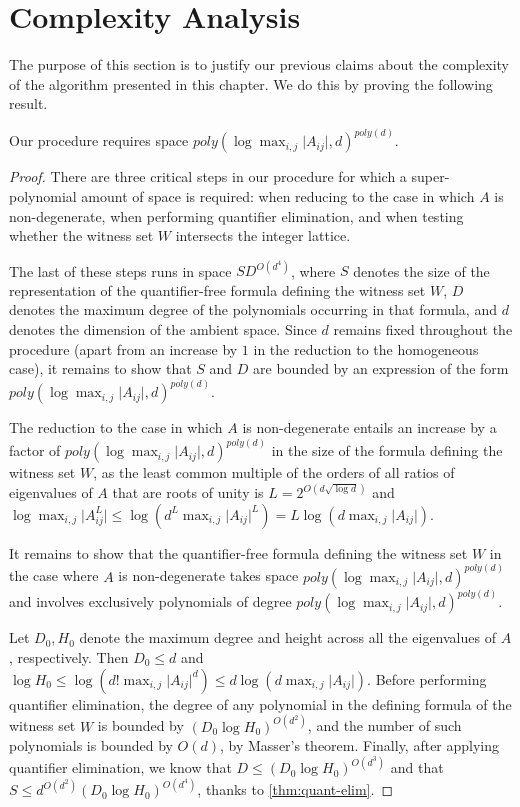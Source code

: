 \section{Complexity Analysis}
\label{sec:complexity}

The purpose of this section is to justify our previous claims about
the complexity of the algorithm presented in this chapter. We do this by
proving the following result.

\begin{proposition}
Our procedure requires space $\mathit{poly}(\log\max_{i,j}\lvert A_{ij}\rvert,d)^{\mathit{poly}(d)}$.
\end{proposition}

\begin{proof}
There are three critical steps in our procedure for which a
super-polynomial amount of space is required: when reducing to the
case in which $A$ is non-degenerate, when performing quantifier
elimination, and when testing whether the witness set $W$ intersects
the integer lattice.

The last of these steps runs in space $SD^{O(d^4)}$, where $S$ denotes
the size of the representation of the quantifier-free formula defining
the witness set $W$, $D$ denotes the maximum degree of the polynomials
occurring in that formula, and $d$ denotes the dimension of the
ambient space. Since $d$ remains fixed throughout the procedure (apart
from an increase by $1$ in the reduction to the homogeneous case), it
remains to show that $S$ and $D$ are bounded by an expression of the
form $\mathit{poly}(\log\max_{i,j}\lvert
A_{ij}\rvert,d)^{\mathit{poly}(d)}$.

The reduction to the case in which $A$ is non-degenerate entails an
increase by a factor of $\mathit{poly}(\log\max_{i,j}\lvert
A_{ij}\rvert,d)^{\mathit{poly}(d)}$ in the size of the formula
defining the witness set $W$, as the least common multiple of the
orders of all ratios of eigenvalues of $A$ that are roots of unity is
$L=2^{O(d\sqrt{\log d})}$ and $\log\max_{i,j}\lvert A^L_{ij}\rvert\leq
\log (d^L\max_{i,j}\lvert A_{ij}\rvert^L)=L\log (d\max_{i,j}\lvert
A_{ij}\rvert)$.

It remains to show that the quantifier-free formula defining the witness set $W$ in the case where $A$ is non-degenerate takes space $\mathit{poly}(\log\max_{i,j}\lvert A_{ij}\rvert,d)^{\mathit{poly}(d)}$ and involves exclusively polynomials of degree $\mathit{poly}(\log\max_{i,j}\lvert A_{ij}\rvert,d)^{\mathit{poly}(d)}$.

Let $D_0,H_0$ denote the maximum degree and height across all the eigenvalues of $A$, respectively. Then $D_0\leq d$ and $\log H_0\leq\log (d!\max_{i,j}\lvert A_{ij}\rvert^{d})\leq d\log (d\max_{i,j}\lvert A_{ij}\rvert)$. Before performing quantifier elimination, the degree of any polynomial in the defining formula of the witness set $W$ is bounded by $(D_0\log H_0)^{O(d^2)}$, and the number of such polynomials is bounded by $O(d)$, by Masser's theorem. Finally, after applying quantifier elimination, we know that $D\leq(D_0\log H_0)^{O(d^3)}$ and that $S\leq d^{O(d^2)}(D_0\log H_0)^{O(d^4)}$, thanks to \cref{thm:quant-elim}.
\end{proof}
